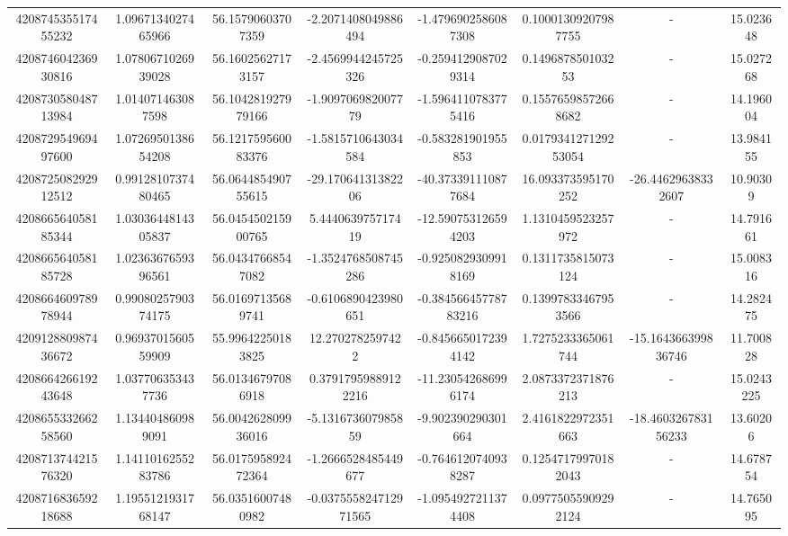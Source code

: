 \documentclass{article}
\begin{document}
\begin{landscape}
\begin{longtable}[c]{S[table-format=18.0]S[table-format=2.15]S[table-format=2.15]S[table-format=-2.17]S[table-format=-2.16]S[table-format=-2.16]S[table-format=-3.16]S[table-format=2.7]}
420874535517455232 & 1.0967134027465966 & 56.15790603707359  & -2.2071408049886494   & -1.4796902586087308  & 0.10001309207987755  & {-}                  & 15.023648  \\
420874604236930816 & 1.0780671026939028 & 56.16025627173157  & -2.4569944245725326   & -0.2594129087029314  & 0.149687850103253    & {-}                  & 15.027268  \\
420873058048713984 & 1.014071463087598  & 56.104281927979166 & -1.909706982007779    & -1.5964110783775416  & 0.15576598572668682  & {-}                  & 14.196004  \\
420872954969497600 & 1.0726950138654208 & 56.121759560083376 & -1.5815710643034584   & -0.583281901955853   & 0.017934127129253054 & {-}                  & 13.984155  \\
420872508292912512 & 0.9912810737480465 & 56.064485490755615 & -29.17064131382206    & -40.373391110877684  & 16.093373595170252   & -26.44629638332607  & 10.90309   \\
420866564058185344 & 1.0303644814305837 & 56.045450215900765 & 5.444063975717419     & -12.590753126594203  & 1.1310459523257972   & {-}                  & 14.791661  \\
420866564058185728 & 1.0236367659396561 & 56.04347668547082  & -1.3524768508745286   & -0.9250829309918169  & 0.1311735815073124   & {-}                  & 15.008316  \\
420866460978978944 & 0.9908025790374175 & 56.01697135689741  & -0.6106890423980651   & -0.38456645778783216 & 0.13997833467953566  & {-}                  & 14.282475  \\
420912880987436672 & 0.9693701560559909 & 55.99642250183825  & 12.2702782597422      & -0.8456650172394142  & 1.7275233365061744   & -15.164366399836746 & 11.700828  \\
420866426619243648 & 1.037706353437736  & 56.01346797086918  & 0.37917959889122216   & -11.230542686996174  & 2.0873372371876213   & {-}                  & 15.0243225 \\
420865533266258560 & 1.134404860989091  & 56.004262809936016 & -5.131673607985859    & -9.902390290301664   & 2.4161822972351663   & -18.460326783156233 & 13.60206   \\
420871374421576320 & 1.1411016255283786 & 56.017595892472364 & -1.2666528485449677   & -0.7646120740938287  & 0.12547179970182043  & {-}                  & 14.678754  \\
420871683659218688 & 1.1955121931768147 & 56.03516007480982  & -0.037555824712971565 & -1.0954927211374408  & 0.09775055909292124  & {-}                  & 14.765095  \\

\end{longtable}
\end{landscape}
\end{document}
